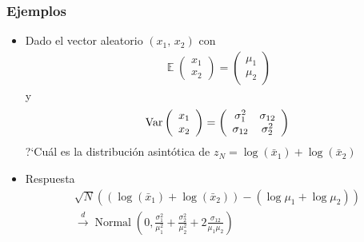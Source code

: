 \documentclass[t, compress, spanish, aspectratio=169]{beamer}
\DeclareMathOperator{\Var}{Var}
\DeclareMathOperator{\N}{Normal}
\DeclareMathOperator{\E}{\mathbb{E}}
\newcommand{\dto}{\stackrel{d}{\longrightarrow}}
\begin{document}
	
	
	\begin{frame}
		\frametitle{Ejemplos}
		\begin{itemize}
			\item Dado el vector aleatorio $(x_1,\, x_2)$
			con
			\begin{align*}
			\E\left(
			\begin{array} {c}
			x_1 \\
			x_2
			\end{array}
			\right)=
			\left(
			\begin{array} {c}
			\mu_1 \\
			\mu_2
			\end{array}
			\right)
			\end{align*} y
			\begin{align*}
			\Var \left(
			\begin{array} {c}
			x_1 \\
			x_2
			\end{array}
			\right)=
			\left(
			\begin{array} {c c}
			\sigma^2_1 &  \sigma_{12}\\
			\sigma_{12} &  \sigma^2_{2}
			\end{array}
			\right)
			\end{align*}
			?`Cu\'al es la distribuci\'on asint\'otica de $z_N=\log(\bar x_1)+\log(\bar x_2)$
			\item Respuesta
			\begin{align*}
             \sqrt{N}((\log(\bar x_1)+\log(\bar x_2))-(\log \mu_1+\log \mu_2)) \\
             \dto\N(0,\frac{\sigma_1^2}{\mu_1^2}+\frac{\sigma_2^2}{\mu_2^2}+2\frac{\sigma_{12}}{\mu_1\mu_2})
            \end{align*}
		\end{itemize}
	\end{frame}
\end{document}
